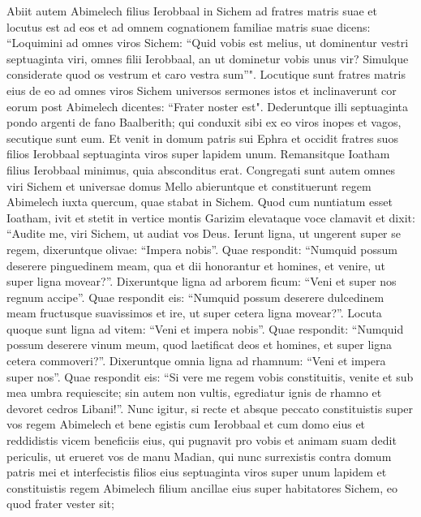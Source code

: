 \begin{biblechapter}  
\verse Abiit autem Abimelech filius Ierobbaal in Sichem ad fratres matris suae et locutus est ad eos et ad omnem cognationem familiae matris suae dicens: 
\verse “Loquimini ad omnes viros Sichem: “Quid vobis est melius, ut dominentur vestri septuaginta viri, omnes filii Ierobbaal, an ut dominetur vobis unus vir? Simulque considerate quod os vestrum et caro vestra sum”". 
\verse Locutique sunt fratres matris eius de eo ad omnes viros Sichem universos sermones istos et inclinaverunt cor eorum post Abimelech dicentes: “Frater noster est". 
\verse Dederuntque illi septuaginta pondo argenti de fano Baalberith; qui conduxit sibi ex eo viros inopes et vagos, secutique sunt eum. 
\verse Et venit in domum patris sui Ephra et occidit fratres suos filios Ierobbaal septuaginta viros super lapidem unum. Remansitque Ioatham filius Ierobbaal minimus, quia absconditus erat. 
\verse Congregati sunt autem omnes viri Sichem et universae domus Mello abieruntque et constituerunt regem Abimelech iuxta quercum, quae stabat in Sichem. 
\verse Quod cum nuntiatum esset Ioatham, ivit et stetit in vertice montis Garizim elevataque voce clamavit et dixit: “Audite me, viri Sichem, ut audiat vos Deus.  
\verse Ierunt ligna, ut ungerent super se regem, dixeruntque olivae: “Impera nobis”.  
\verse Quae respondit: “Numquid possum deserere pinguedinem meam, qua et dii honorantur et homines, et venire, ut super ligna movear?”. 
\verse Dixeruntque ligna ad arborem ficum: “Veni et super nos regnum accipe”. 
\verse Quae respondit eis: “Numquid possum deserere dulcedinem meam fructusque suavissimos et ire, ut super cetera ligna movear?”. 
\verse Locuta quoque sunt ligna ad vitem: “Veni et impera nobis”. 
\verse Quae respondit: “Numquid possum deserere vinum meum, quod laetificat deos et homines, et super ligna cetera commoveri?”. 
\verse Dixeruntque omnia ligna ad rhamnum: “Veni et impera super nos”. 
\verse Quae respondit eis: “Si vere me regem vobis constituitis, venite et sub mea umbra requiescite; sin autem non vultis, egrediatur ignis de rhamno et devoret cedros Libani!”. 
\verse Nunc igitur, si recte et absque peccato constituistis super vos regem Abimelech et bene egistis cum Ierobbaal et cum domo eius et reddidistis vicem beneficiis eius, 
\verse qui pugnavit pro vobis et animam suam dedit periculis, ut erueret vos de manu Madian, 
\verse qui nunc surrexistis contra domum patris mei et interfecistis filios eius septuaginta viros super unum lapidem et constituistis regem Abimelech filium ancillae eius super habitatores Sichem, eo quod frater vester sit; 

\end{biblechapter}
